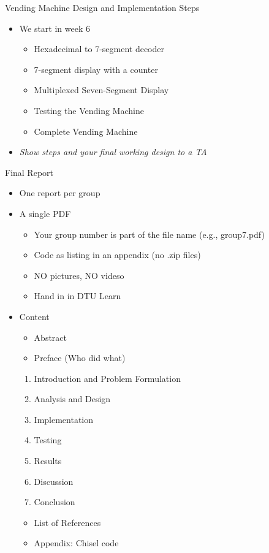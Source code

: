\begin{frame}[fragile]{Vending Machine Design and Implementation Steps}
\begin{itemize}
\item We start in week 6
\begin{itemize}
\item Hexadecimal to 7-segment decoder
\item 7-segment display with a counter
\item Multiplexed Seven-Segment Display
\item Testing the Vending Machine
\item Complete Vending Machine
\end{itemize}
\item \emph{Show steps and your final working design to a TA}
\end{itemize}
\end{frame}

\begin{frame}[fragile]{Final Report}
\begin{itemize}
\item One report per group
\item A single PDF
\begin{itemize}
\item Your group number is part of the file name (e.g., group7.pdf)
\item Code as listing in an appendix (no .zip files)
\item NO pictures, NO videso
\item Hand in in DTU Learn
\end{itemize}
\item Content
\begin{itemize}
\item Abstract
\item Preface (Who did what)
\end{itemize}
\begin{enumerate}
\item Introduction and Problem Formulation
\item Analysis and Design
\item Implementation
\item Testing
\item Results
\item Discussion
\item Conclusion
\end{enumerate}
\begin{itemize}
\item List of References
\item Appendix: Chisel code
\end{itemize}
\end{itemize}
\end{frame}

